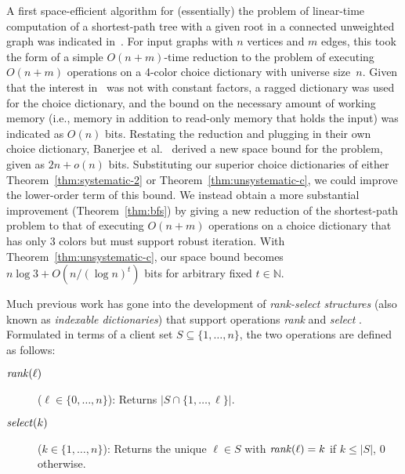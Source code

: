 \documentclass[envcountsame,envcountsect,undated,nolinenumbers]{lnthi}
\def\Tvn#1{\hbox{\textit{#1\/}}}
\def\TbbbN{\mathbb{N}}
\begin{document}
A first space-efficient algorithm
for (essentially) the problem of linear-time
computation of a
shortest-path tree with a given root in a connected
unweighted graph was indicated in~\cite[Theorem 5.1]{ElmHK15}.
For input graphs with $n$ vertices and $m$ edges,
this took the form of a simple $O(n+m)$-time
reduction
to the problem of executing $O(n+m)$ operations on a
4-color choice dictionary with universe size~$n$.
Given that the interest in~\cite{ElmHK15} was not
with constant factors, a ragged dictionary was used
for the choice dictionary, and the bound on the
necessary amount of working memory
(i.e., memory in addition to read-only memory
that holds the input)
was indicated as $O(n)$ bits.
Restating the reduction and plugging in their own
choice dictionary, Banerjee et al.~\cite{BanCR16} derived a new
space bound for the problem, given as $2 n+o(n)$ bits.
Substituting our superior choice dictionaries of
either Theorem~\ref{thm:systematic-2} or
Theorem~\ref{thm:unsystematic-c}, we could
improve the lower-order term of this bound.
We instead obtain a more substantial
improvement (Theorem~\ref{thm:bfs}) by giving a new reduction of the
shortest-path problem to that of executing
$O(n+m)$ operations on a
choice dictionary that has only 3 colors
but must support robust iteration.
With Theorem~\ref{thm:unsystematic-c}, our space
bound becomes $n\log 3+O({n/{(\log n)^t}})$ bits
for arbitrary fixed $t\in\TbbbN$.

Much previous work has gone into the development of
\emph{rank-select structures} (also known as
\emph{indexable dictionaries}) that support
operations \Tvn{rank} and \Tvn{select}
\cite{Jac89}.
Formulated in terms of a client set
$S\subseteq\{1,\ldots,n\}$,
the two operations
are defined as follows:

\begin{description}
\item[\normalfont$\Tvn{rank}(\ell)$]
($\ell\in\{0,\ldots,n\}$):
Returns $|S\cap\{1,\ldots,\ell\}|$.
\item[\normalfont$\Tvn{select}(k)$]
($k\in\{1,\ldots,n\}$):
Returns the unique $\ell\in S$ with $\Tvn{rank}(\ell)=k$
if $k\le|S|$, 0 otherwise.
\end{description}
\end{document}

